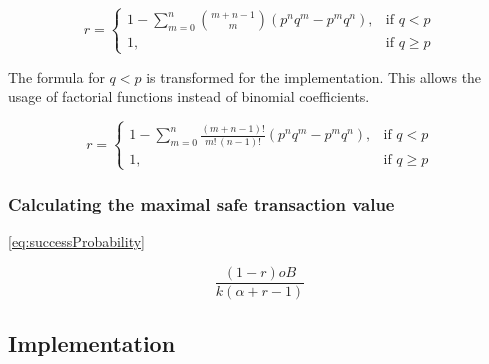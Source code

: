 \begin{equation}
    r = 
\begin{cases}
    1-\sum\limits_{m=0}^n \binom{m+n-1}{m}(p^nq^m-p^mq^n),& \text{if } q < p\\
    1,              & \text{if } q \geq p
\end{cases}
\end{equation}

The formula for $q < p$ is transformed for the implementation. This allows the usage of factorial functions instead of binomial coefficients.

\begin{equation}\label{eq:successProbability}
    r = 
\begin{cases}
    1-\sum\limits_{m=0}^n \frac{(m+n-1)!}{m!\,(n-1)!}(p^nq^m-p^mq^n),& \text{if } q < p\\
    1,              & \text{if } q \geq p
\end{cases}
\end{equation}

\subsubsection{Calculating the maximal safe transaction value  \cite{doublespending}}

\eqref{eq:successProbability}

\begin{equation}
\dfrac{(1 - r) oB}{ k  (\alpha + r - 1)}
\end{equation}

\subsection{Implementation}